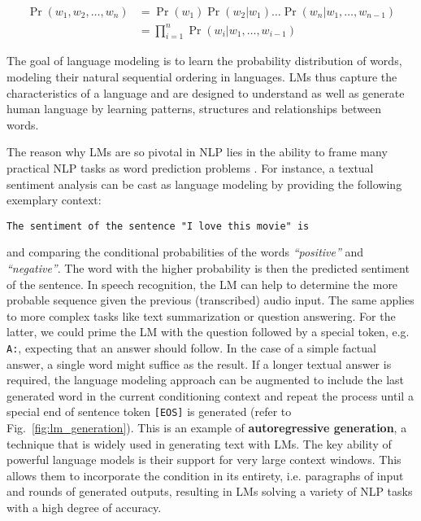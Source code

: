 \begin{align}
    \Pr(w_1, w_2, \ldots, w_n) &= \Pr(w_1) \Pr(w_2 | w_1) \ldots \Pr(w_n | w_1, \ldots, w_{n-1}) \nonumber \\
    &= \prod_{i=1}^{n} \Pr(w_i | w_1, \ldots, w_{i-1})
\end{align}

The goal of language modeling is to learn the probability distribution of words,
modeling their natural sequential ordering in languages. LMs thus capture the
characteristics of a language and are designed to understand as well as generate
human language by learning patterns, structures and relationships between words.

The reason why LMs are so pivotal in NLP lies in the ability to frame many
practical NLP tasks as word prediction problems \cite{radford2018improving}. For
instance, a textual sentiment analysis can be cast as language modeling by
providing the following exemplary context:

\begin{center}
    \texttt{The sentiment of the sentence "I love this movie" is}
\end{center}

and comparing the conditional probabilities of the words \textit{``positive''}
and \textit{``negative''}. The word with the higher probability is then the
predicted sentiment of the sentence. In speech recognition, the LM can help to
determine the more probable sequence given the previous (transcribed) audio
input. The same applies to more complex tasks like text summarization or
question answering. For the latter, we could prime the LM with the question
followed by a special token, e.g. \texttt{A:}, expecting that an answer should
follow. In the case of a simple factual answer, a single word might suffice as
the result. If a longer textual answer is required, the language modeling
approach can be augmented to include the last generated word in the current
conditioning context and repeat the process until a special end of sentence
token \texttt{[EOS]} is generated (refer to Fig.~\ref{fig:lm_generation}). This
is an example of \textbf{autoregressive generation}, a technique that is widely
used in generating text with LMs. The key ability of powerful language models is
their support for very large context windows. This allows them to incorporate
the condition in its entirety, i.e. paragraphs of input and rounds of generated
outputs, resulting in LMs solving a variety of NLP tasks with a high degree of
accuracy.


